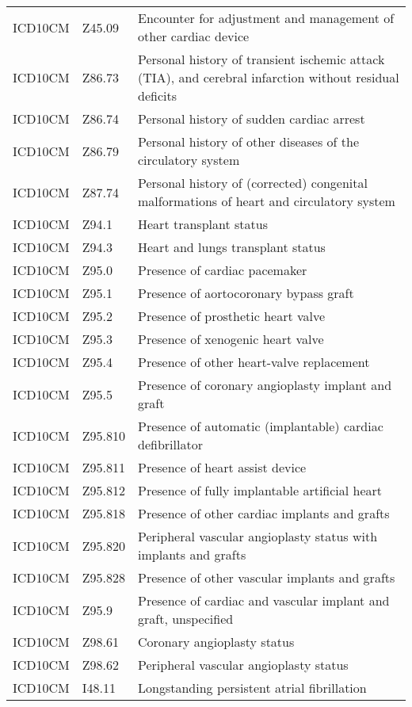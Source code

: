 \begin{longtable}{p{}p{}p{}}
  ICD10CM & Z45.09 & Encounter for adjustment and management of other cardiac device \\ 
  ICD10CM & Z86.73 & Personal history of transient ischemic attack (TIA), and cerebral infarction without residual deficits \\ 
  ICD10CM & Z86.74 & Personal history of sudden cardiac arrest \\ 
  ICD10CM & Z86.79 & Personal history of other diseases of the circulatory system \\ 
  ICD10CM & Z87.74 & Personal history of (corrected) congenital malformations of heart and circulatory system \\ 
  ICD10CM & Z94.1 & Heart transplant status \\ 
  ICD10CM & Z94.3 & Heart and lungs transplant status \\ 
  ICD10CM & Z95.0 & Presence of cardiac pacemaker \\ 
  ICD10CM & Z95.1 & Presence of aortocoronary bypass graft \\ 
  ICD10CM & Z95.2 & Presence of prosthetic heart valve \\ 
  ICD10CM & Z95.3 & Presence of xenogenic heart valve \\ 
  ICD10CM & Z95.4 & Presence of other heart-valve replacement \\ 
  ICD10CM & Z95.5 & Presence of coronary angioplasty implant and graft \\ 
  ICD10CM & Z95.810 & Presence of automatic (implantable) cardiac defibrillator \\ 
  ICD10CM & Z95.811 & Presence of heart assist device \\ 
  ICD10CM & Z95.812 & Presence of fully implantable artificial heart \\ 
  ICD10CM & Z95.818 & Presence of other cardiac implants and grafts \\ 
  ICD10CM & Z95.820 & Peripheral vascular angioplasty status with implants and grafts \\ 
  ICD10CM & Z95.828 & Presence of other vascular implants and grafts \\ 
  ICD10CM & Z95.9 & Presence of cardiac and vascular implant and graft, unspecified \\ 
  ICD10CM & Z98.61 & Coronary angioplasty status \\ 
  ICD10CM & Z98.62 & Peripheral vascular angioplasty status \\ 
  ICD10CM & I48.11 & Longstanding persistent atrial fibrillation \\ 

\end{longtable}
